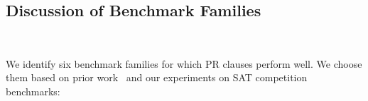 




\subsection{Discussion of Benchmark Families}~\label{subsec:eval-discussion}

We identify six benchmark families for which PR clauses perform well. We choose
them based on prior work~\cite{prelearn} and our experiments on SAT competition
benchmarks:

